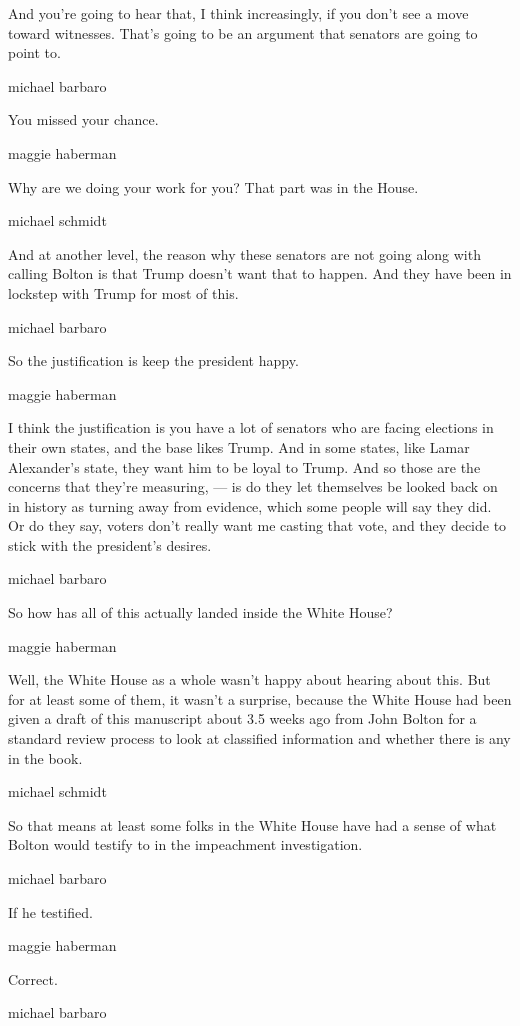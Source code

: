 And you're going to hear that, I think increasingly, if you don't see a
move toward witnesses. That's going to be an argument that senators are
going to point to.

michael barbaro

You missed your chance.

maggie haberman

Why are we doing your work for you? That part was in the House.

michael schmidt

And at another level, the reason why these senators are not going along
with calling Bolton is that Trump doesn't want that to happen. And they
have been in lockstep with Trump for most of this.

michael barbaro

So the justification is keep the president happy.

maggie haberman

I think the justification is you have a lot of senators who are facing
elections in their own states, and the base likes Trump. And in some
states, like Lamar Alexander's state, they want him to be loyal to
Trump. And so those are the concerns that they're measuring, --- is do
they let themselves be looked back on in history as turning away from
evidence, which some people will say they did. Or do they say, voters
don't really want me casting that vote, and they decide to stick with
the president's desires.

michael barbaro

So how has all of this actually landed inside the White House?

maggie haberman

Well, the White House as a whole wasn't happy about hearing about this.
But for at least some of them, it wasn't a surprise, because the White
House had been given a draft of this manuscript about 3.5 weeks ago from
John Bolton for a standard review process to look at classified
information and whether there is any in the book.

michael schmidt

So that means at least some folks in the White House have had a sense of
what Bolton would testify to in the impeachment investigation.

michael barbaro

If he testified.

maggie haberman

Correct.

michael barbaro

